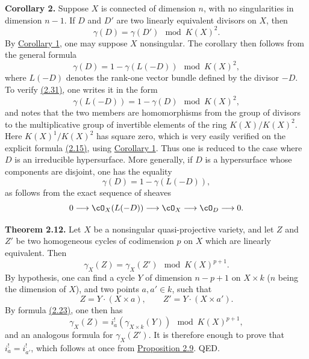 \textbf{Corollary 2.} Suppose $X$ is connected of dimension $n$, with no singularities in dimension $n-1$. If $D$ and $D'$ are two linearly equivalent divisors on $X$, then
\[
 \gamma(D)=\gamma(D')\mod K(X)^2.
\]
By \hyperlink{sga6.e00.cor.1}{Corollary 1}, one may suppose $X$ nonsingular. The corollary then follows from the general formula
\begin{equation}\tag{2.31}
 \gamma(D)=1-\gamma(L(-D))\mod K(X)^2,
\end{equation}
where $L(-D)$ denotes the rank-one vector bundle defined by the divisor $-D$. To verify \hyperlink{sga6.e00.eq.2-31}{(2.31)}, one writes it in the form
\begin{equation}\tag{2.31 bis}
 \gamma(L(-D))=1-\gamma(D)\mod K(X)^2,
\end{equation}
and notes that the two members are homomorphisms from the group of divisors to the multiplicative group of invertible elements of the ring $K(X)/K(X)^2$. Here $K(X)^1/K(X)^2$ has square zero, which is very easily verified on the explicit formula \hyperlink{sga6.e00.eq.2-15}{(2.15)}, using \hyperlink{sga6.e00.cor.1}{Corollary 1}. Thus one is reduced to the case where $D$ is an irreducible hypersurface. More generally, if $D$ is a hypersurface whose components are disjoint, one has the equality
\begin{equation}\tag{2.32}
 \gamma(D)=1-\gamma(L(-D)),
\end{equation}
as follows from the exact sequence of sheaves
\[
0\longrightarrow \cO_X(L(-D))\longrightarrow \cO_X\longrightarrow \cO_D\longrightarrow 0.
\]

\textbf{Theorem 2.12.} Let $X$ be a nonsingular quasi-projective variety, and let $Z$ and $Z'$ be two homogeneous cycles of codimension $p$ on $X$ which are linearly equivalent. Then
\begin{equation}\tag{2.33}
 \gamma_X(Z)=\gamma_X(Z')\mod K(X)^{p+1}.
\end{equation}
By hypothesis, one can find a cycle $Y$ of dimension $n-p+1$ on $X\times k$ ($n$ being the dimension of $X$), and two points $a,a'\in k$, such that
\[
 Z=Y\cdot (X\times a),\qquad Z'=Y\cdot (X\times a').
\]
By formula \hyperlink{sga6.e00.eq.2-23}{(2.23)}, one then has
\[
 \gamma_X(Z)=i_a^!(\gamma_{X\times k}(Y))\mod K(X)^{p+1},
\]
and an analogous formula for $\gamma_X(Z')$. It is therefore enough to prove that $i_a^!=i_{a'}^!$, which follows at once from \hyperlink{sga6.e00.prop.2-9}{Proposition 2.9}. QED.

